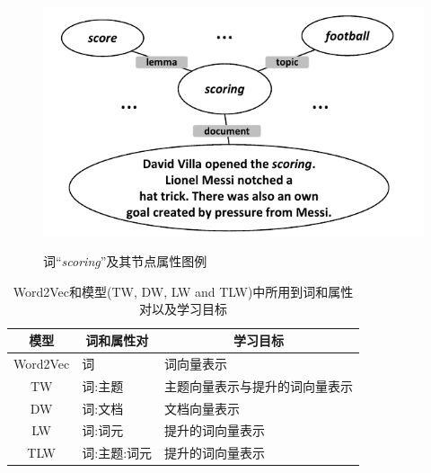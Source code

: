 \documentclass[master]{njuthesis}
\begin{document}
\begin{figure}[t]
  \centering
  \includegraphics[width= 1.0\textwidth]{figures//word_topic_lemma_document_chap4.pdf}\\
  \caption{词``{\it scoring}''及其节点属性图例}\label{fig:wtld_chap4}
\end{figure}

\begin{table}[t]
\begin{center}
\begin{tabular}{|c|l|l|}
\hline
\textbf{模型} & \multicolumn{1}{c|}{\textbf{词和属性对}} & \multicolumn{1}{c|}{\textbf{学习目标}}                        \\ \hline
Word2Vec        & 词                                              & 词向量表示                                                 \\ \hline
TW              & 词:主题                                        & 主题向量表示与提升的词向量表示 \\ \hline
DW              & 词:文档                                     & 文档向量表示                                            \\ \hline
LW              & 词:词元                                      & 提升的词向量表示                           \\ \hline
TLW             & 词:主题:词元                                 & 提升的词向量表示            \\ \hline
\end{tabular}
\end{center}
\caption{\label{tab:word_attributes} Word2Vec\cite{mikolov2013efficient}和模型(TW, DW, LW and TLW)中所用到词和属性对以及学习目标}
\end{table}
\end{document}
